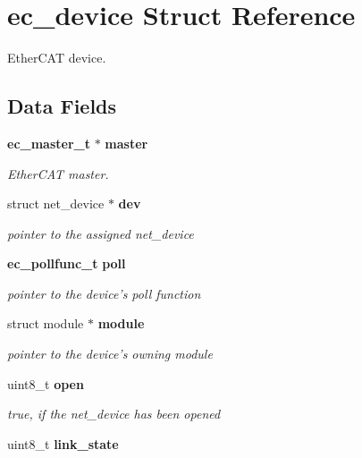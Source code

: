 \section{ec\-\_\-device Struct Reference}
\label{structec__device}


Ether\-C\-A\-T device.  


\subsection*{Data Fields}
\begin{DoxyCompactItemize}
\item 
{\bf ec\-\_\-master\-\_\-t} $\ast$ {\bf master}\label{structec__device_a3678edcc317d6324936b02c4509de443}

\begin{DoxyCompactList}\small\item\em Ether\-C\-A\-T master. \end{DoxyCompactList}\item 
struct net\-\_\-device $\ast$ {\bf dev}\label{structec__device_a9503692598d3950969ca8b4daf5fd5ac}

\begin{DoxyCompactList}\small\item\em pointer to the assigned net\-\_\-device \end{DoxyCompactList}\item 
{\bf ec\-\_\-pollfunc\-\_\-t} {\bf poll}\label{structec__device_aa51d769eb590a04e98f8544ea758322f}

\begin{DoxyCompactList}\small\item\em pointer to the device's poll function \end{DoxyCompactList}\item 
struct module $\ast$ {\bf module}\label{structec__device_a79af9075672aa2abf993a703b4d964ed}

\begin{DoxyCompactList}\small\item\em pointer to the device's owning module \end{DoxyCompactList}\item 
uint8\-\_\-t {\bf open}\label{structec__device_a0a3f5a12926e0d4ef17409d05b36d18a}

\begin{DoxyCompactList}\small\item\em true, if the net\-\_\-device has been opened \end{DoxyCompactList}\item 
uint8\-\_\-t {\bf link\-\_\-state}\label{structec__device_ab58236227ed28e568e0de571499d5e68}


\end{DoxyCompactItemize}
